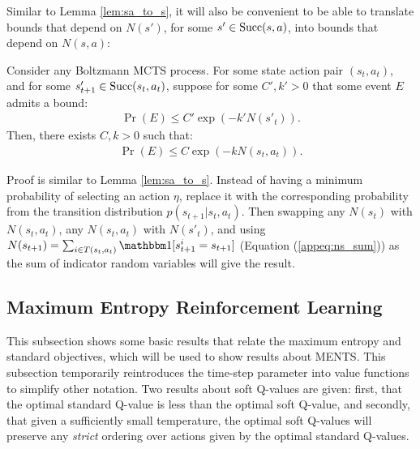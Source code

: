     Similar to Lemma \ref{lem:sa_to_s}, it will also be convenient to be able to translate bounds that depend on $N(s')$, for some $s'\in{\textnormal{Succ}(s,a)}$, into bounds that depend on $N(s,a)$:
    \begin{lemma} \label{lem:s_to_sa}
        Consider any Boltzmann MCTS process. For some state action pair $(s_t,a_t)$, and for some $s'_{t+1}\in{\textnormal{Succ}(s_t,a_t)}$, suppose for some $C',k'>0$ that some event $E$ admits a bound:
        \begin{align}
            \Pr(E) \leq C'\exp(-k'N(s'_t)).
        \end{align}
        Then, there exists $C,k>0$ such that:
        \begin{align}
            \Pr(E) \leq C\exp(-k N(s_t,a_t)).
        \end{align}
    \end{lemma}
    \begin{proofoutline}
        Proof is similar to Lemma \ref{lem:sa_to_s}. Instead of having a minimum probability of selecting an action $\eta$, replace it with the corresponding probability from the transition distribution $p(s_{t+1}|s_t,a_t)$. Then swapping any $N(s_t)$ with $N(s_t,a_t)$, any $N(s_t,a_t)$ with $N(s'_t)$, and using $N(s_{t+1}) = \sum_{i\in T(s_t,a_t)} \one[s^i_{t+1} = s_{t+1}]$ (Equation (\ref{appeq:ns_sum})) as the sum of indicator random variables will give the result.
    \end{proofoutline}














\subsection{Maximum Entropy Reinforcement Learning} \label{app:soft_learning_results}



    This subsection shows some basic results that relate the maximum entropy and standard objectives, which will be used to show results about MENTS. This subsection temporarily reintroduces the time-step parameter into value functions to simplify other notation. Two results about soft Q-values are given: first, that the optimal standard Q-value is less than the optimal soft Q-value, and secondly, that given a sufficiently small temperature, the optimal soft Q-values will preserve any \textit{strict} ordering over actions given by the optimal standard Q-values. 







